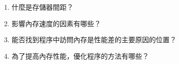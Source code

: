 \begin{enumerate}
\item 什麼是存儲器間距？
\item 影響內存速度的因素有哪些？
\item 能否找到程序中訪問內存是性能差的主要原因的位置？
\item 為了提高內存性能，優化程序的方法有哪些？
\end{enumerate}